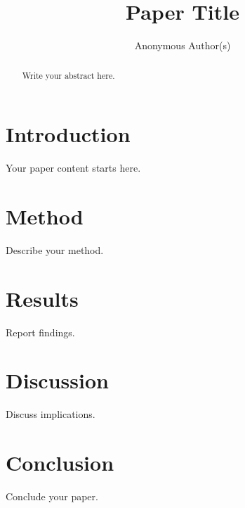 \documentclass[sigconf,anonymous,review]{acmart}
\begin{document}
\title{Paper Title}

\author{Anonymous Author(s)}

\begin{abstract}
Write your abstract here.
\end{abstract}


\maketitle

\section{Introduction}
Your paper content starts here.

\section{Method}
Describe your method.

\section{Results}
Report findings.

\section{Discussion}
Discuss implications.

\section{Conclusion}
Conclude your paper.



\end{document}
